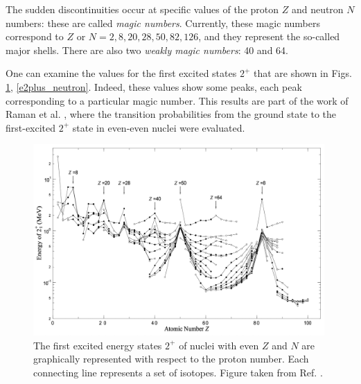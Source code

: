 The sudden discontinuities occur at specific values of the proton $Z$ and neutron $N$ numbers: these are called \emph{magic numbers}. Currently, these magic numbers correspond to $Z$ or $N=2,8,20,28,50,82,126$, and they represent the so-called major shells. There are also two \emph{weakly magic numbers}: 40 and 64.

One can examine the values for the first excited states $2^+$ that are shown in Figs. \ref{e2plus_proton}, \ref{e2plus_neutron}. Indeed, these values show some peaks, each peak corresponding to a particular magic number. This results are part of the work of Raman et al. \cite{raman2001transition}, where the transition probabilities from the ground state to the first-excited $2^+$ state in even-even nuclei were evaluated.

\begin{figure}
    \centering
    \includegraphics[width=0.99\textwidth]{Chapters/Figures/E2plus_proton.pdf}
    \caption{The first excited energy states $2^+$ of nuclei with even $Z$ and $N$ are graphically represented with respect to the proton number. Each connecting line represents a set of isotopes. Figure taken from Ref. \cite{matta2017exotic}.}
    \label{e2plus_proton}
\end{figure}

